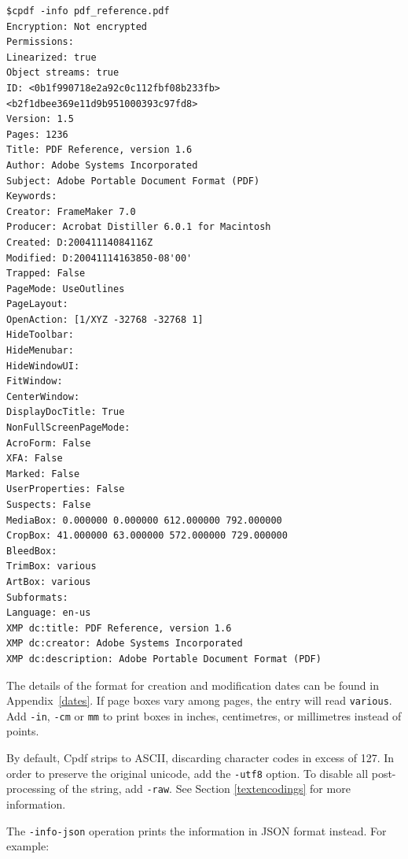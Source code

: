 \documentclass{book}
\begin{document}
\begin{framed}
{\small\begin{verbatim}
$cpdf -info pdf_reference.pdf
Encryption: Not encrypted
Permissions: 
Linearized: true
Object streams: true
ID: <0b1f990718e2a92c0c112fbf08b233fb> <b2f1dbee369e11d9b951000393c97fd8>
Version: 1.5
Pages: 1236
Title: PDF Reference, version 1.6
Author: Adobe Systems Incorporated
Subject: Adobe Portable Document Format (PDF)
Keywords: 
Creator: FrameMaker 7.0
Producer: Acrobat Distiller 6.0.1 for Macintosh
Created: D:20041114084116Z
Modified: D:20041114163850-08'00'
Trapped: False
PageMode: UseOutlines
PageLayout: 
OpenAction: [1/XYZ -32768 -32768 1]
HideToolbar: 
HideMenubar: 
HideWindowUI: 
FitWindow: 
CenterWindow: 
DisplayDocTitle: True
NonFullScreenPageMode: 
AcroForm: False
XFA: False
Marked: False
UserProperties: False
Suspects: False
MediaBox: 0.000000 0.000000 612.000000 792.000000
CropBox: 41.000000 63.000000 572.000000 729.000000
BleedBox: 
TrimBox: various
ArtBox: various
Subformats: 
Language: en-us
XMP dc:title: PDF Reference, version 1.6
XMP dc:creator: Adobe Systems Incorporated
XMP dc:description: Adobe Portable Document Format (PDF)
\end{verbatim}}\end{framed}

\noindent The details of the format for creation and modification dates can be found in
Appendix~\ref{dates}. If page boxes vary among pages, the entry will read \texttt{various}. Add \texttt{-in}, \texttt{-cm} or \texttt{mm} to print boxes in inches, centimetres, or millimetres instead of points.

By default, Cpdf strips to ASCII, discarding character codes in excess of 127. In order to preserve the original unicode, add the \texttt{-utf8} option. To disable all post-processing of the string, add \texttt{-raw}. See Section \ref{textencodings} for more information.

The \texttt{-info-json} operation prints the information in JSON format instead. For example:
\end{document}
